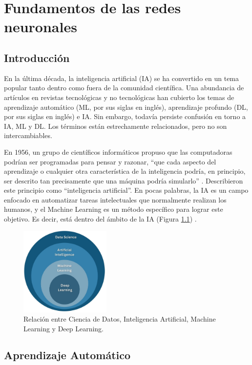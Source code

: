 \chapter{Fundamentos de las redes neuronales} \label{Capitulo_2}
\section{Introducción}

En la última década, la inteligencia artificial (IA) se ha convertido en un tema popular tanto dentro como fuera de la comunidad científica. Una abundancia de artículos en revistas tecnológicas y no tecnológicas han cubierto los temas de aprendizaje automático (ML, por sus siglas en inglés), aprendizaje profundo (DL, por sus siglas en inglés) e IA. Sin embargo, todavía persiste confusión en torno a IA, ML y DL. Los términos están estrechamente relacionados, pero no son intercambiables. 

En 1956, un grupo de científicos informáticos propuso que las computadoras podrían ser programadas para pensar y razonar, ``que cada aspecto del aprendizaje o cualquier otra característica de la inteligencia podría, en principio, ser descrito tan precisamente que una máquina podría simularlo'' \citep{moor2006dartmouth}. Describieron este principio como ``inteligencia artificial''. En pocas palabras, la IA es un campo enfocado en automatizar tareas intelectuales que normalmente realizan los humanos, y el Machine Learning es un método específico para lograr este objetivo. Es decir, está dentro del ámbito de la IA (Figura \ref{fig: ia}) \citep{choi2020introduction}. 

\begin{figure}[h!]
    \centering
    \includegraphics[width=0.4\textwidth]{img/ia.jpg}
    \caption{Relación entre Ciencia de Datos, Inteligencia Artificial, Machine Learning y Deep Learning.}
    \label{fig: ia}
\end{figure}


\section{Aprendizaje Automático}

